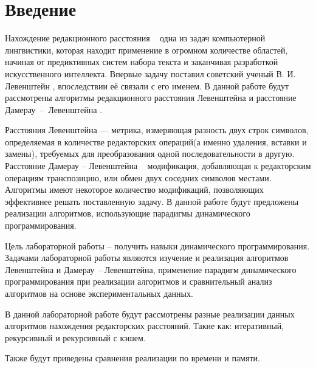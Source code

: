 \chapter*{Введение}

Нахождение редакционного расстояния ~ одна из задач компьютерной лингвистики, которая находит применение в огромном количестве областей, начиная от предиктивных систем набора текста и заканчивая разработкой искусственного интеллекта. Впервые задачу поставил советский ученый В. И. Левенштейн \cite{Lev1965}, впоследствии её связали с его именем. В данной работе будут рассмотрены алгоритмы редакционного расстояния Левенштейна и расстояние Дамерау \,--\, Левенштейна \cite{damerau}.

Расстояния Левенштейна --- метрика, измеряющая разность двух строк символов, определяемая в количестве редакторских операций(а именно удаления, вставки и замены), требуемых для преобразования одной последовательности в другую.  Расстояние Дамерау -- Левенштейна ~ модификация, добавляющая к редакторским операциям транспозицию, или обмен двух соседних символов местами.
Алгоритмы имеют некоторое количество модификаций, позволяющих эффективнее решать поставленную задачу. В данной работе будут предложены реализации алгоритмов, использующие парадигмы динамического программирования.

Цель лабораторной работы -- получить навыки динамического программирования. 
Задачами лабораторной работы являются изучение и реализация алгоритмов Левенштейна и Дамерау \,--\,Левенштейна, применение парадигм динамического программирования при реализации алгоритмов и сравнительный анализ алгоритмов на основе экспериментальных данных.

В данной лабораторной работе будут рассмотрены разные реализации данных алгоритмов нахождения редакторских расстояний. Такие как: итеративный, рекурсивный и рекурсивный с кэшем. 

Также будут приведены сравнения реализации по времени и памяти.